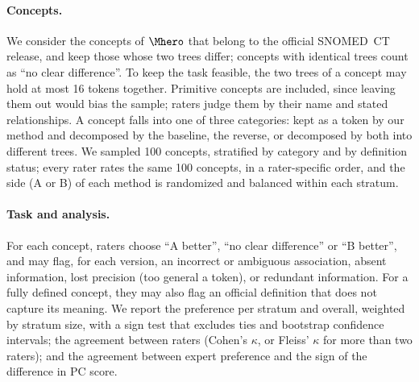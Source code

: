 \paragraph{Concepts.}
We consider the concepts of $\Mhero$ that belong to the official SNOMED~CT release, and keep those whose two trees differ; concepts with identical trees count as ``no clear difference''.
To keep the task feasible, the two trees of a concept may hold at most 16 tokens together.
Primitive concepts are included, since leaving them out would bias the sample; raters judge them by their name and stated relationships.
A concept falls into one of three categories: kept as a token by our method and decomposed by the baseline, the reverse, or decomposed by both into different trees.
We sampled 100 concepts, stratified by category and by definition status; every rater rates the same 100 concepts, in a rater-specific order, and the side (A or B) of each method is randomized and balanced within each stratum.

\paragraph{Task and analysis.}
For each concept, raters choose ``A better'', ``no clear difference'' or ``B better'', and may flag, for each version, an incorrect or ambiguous association, absent information, lost precision (too general a token), or redundant information.
For a fully defined concept, they may also flag an official definition that does not capture its meaning.
We report the preference per stratum and overall, weighted by stratum size, with a sign test that excludes ties and bootstrap confidence intervals; the agreement between raters (Cohen's $\kappa$, or Fleiss' $\kappa$ for more than two raters); and the agreement between expert preference and the sign of the difference in PC score.
